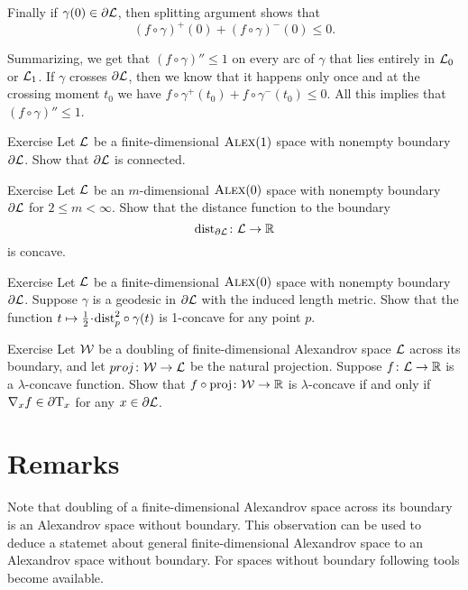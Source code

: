 Finally if $\gamma(0)\in\partial\mathcal{L}$, then splitting argument shows that 
\[(f\circ\gamma)^+(0)+(f\circ\gamma)^-(0)\le 0.\]

Summarizing, we get that $(f\circ\gamma)''\le 1$ on every arc of $\gamma$ that lies entirely in $\mathcal{L}_0$ or $\mathcal{L}_1$.
If $\gamma$ crosses $\partial \mathcal{L}$, then we know that it happens only once and at the crossing moment $t_0$ 
we have $f\circ\gamma^+(t_0)+f\circ\gamma^-(t_0)\le 0$.
All this implies that $(f\circ\gamma)''\le 1$.
\qeds

\begin{thm}{Exercise}\label{ex:bry-connected}
Let $\mathcal{L}$ be a finite-dimensional $\textsc{Alex}(1)$ space with nonempty boundary $\partial\mathcal{L}$.
Show that $\partial\mathcal{L}$ is connected.
\end{thm}


\begin{thm}{Exercise}\label{ex:dist-to-bry}
Let $\mathcal{L}$ be an $m$-dimensional $\textsc{Alex}(0)$ space with nonempty boundary $\partial\mathcal{L}$
for $2\le m<\infty$.
Show that the distance function to the boundary
\[\mathrm{dist}_{\partial\mathcal{L}}\colon\mathcal{L}\to\mathbb{R}\]
is concave.
\end{thm}

\begin{thm}{Exercise}\label{ex:liberman}
Let $\mathcal{L}$ be a finite-dimensional $\textsc{Alex}(0)$ space with nonempty boundary $\partial\mathcal{L}$.
Suppose $\gamma$ is a geodesic in $\partial\mathcal{L}$ with the induced length metric.
Show that the function $t\mapsto \tfrac12\cdot\distfun_p^2\circ\gamma(t)$ is 1-concave for any point $p$. 
\end{thm}

\begin{thm}{Exercise}\label{ex:native}
Let $\mathcal{W}$ be a doubling of finite-dimensional Alexandrov space $\mathcal{L}$ across its boundary,
and let $proj\colon\mathcal{W}\to\mathcal{L}$ be the natural projection.
Suppose $f\colon\mathcal{L}\to\mathbb{R}$ is a $\lambda$-concave function.
Show that $f\circ\operatorname{\rm proj}\nolimits\colon\mathcal{W}\to\mathbb{R}$ is $\lambda$-concave if and only if $\nabla_xf\in \partial \mathrm{T}_x$ 
for any $x\in\partial \mathcal{L}$.
\end{thm}



\section{Remarks}

Note that doubling of a finite-dimensional Alexandrov space across its boundary is an Alexandrov space without boundary.
This observation can be used to deduce a statemet about general finite-dimensional Alexandrov space to an Alexandrov space without boundary.
For spaces without boundary following tools become available.


